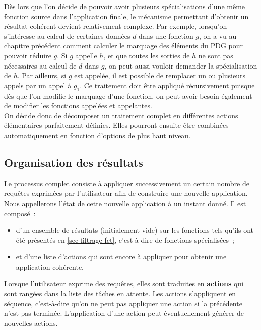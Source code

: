Dès lors que l'on décide de pouvoir avoir plusieurs spécialisations d'une même
fonction source dans l'application finale,
le mécanisme permettant d'obtenir un résultat cohérent devient relativement
complexe. Par exemple,
lorsqu'on s'intéresse au calcul de certaines données $d$ dans une fonction $g$, 
on a vu au chapitre précédent comment calculer le marquage des éléments du PDG
pour pouvoir réduire $g$. 
Si $g$ appelle $h$, et que toutes les sorties de $h$ ne sont pas nécessaires au
calcul de $d$ dans $g$, on peut aussi vouloir demander la spécialisation de $h$.
Par ailleurs, si $g$ est appelée, 
il est possible de remplacer un ou plusieurs appels par un appel
à $g_1$. Ce traitement doit être appliqué récursivement puisque dès que l'on
modifie le marquage d'une fonction, on peut avoir besoin également de modifier
les fonctions appelées et appelantes.\\

On décide donc de décomposer un traitement complet en différentes
actions élémentaires parfaitement définies. Elles pourront ensuite être
combinées automatiquement en fonction d'options de plus haut niveau.

\subsection{Organisation des résultats}

Le processus complet consiste à appliquer successivement 
un certain nombre de requêtes exprimées par l'utilisateur
afin de construire une nouvelle application.
Nous appellerons  
l'état de cette nouvelle application à un instant donné.
Il est composé~:
\begin{itemize}
  \item d'un ensemble de résultats (initialement vide)
    sur les fonctions tels qu'ils ont été
    présentés en \ref{sec-filtrage-fct}, c'est-à-dire de fonctions
    spécialisées~;
  \item et d'une liste d'actions qui sont
encore à appliquer pour obtenir une application cohérente.
\end{itemize}
\bb

Lorsque l'utilisateur exprime des requêtes, elles sont traduites en
{\bf actions} qui sont rangées dans la liste des tâches en attente. 
Les actions s'appliquent en séquence, c'est-à-dire qu'on ne peut pas appliquer
une action si la précédente n'est pas terminée.
L'application d'une action peut éventuellement générer de nouvelles actions.
\bb

